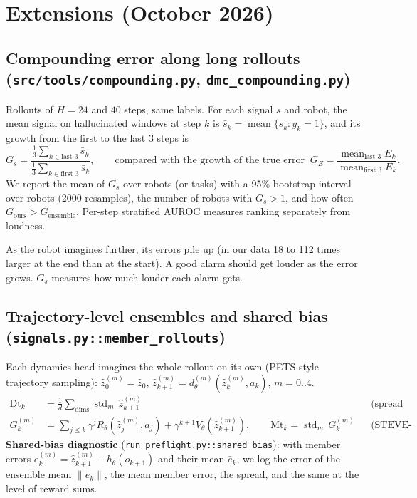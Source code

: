 \documentclass[11pt]{article}
\newcommand{\sd}{\operatorname{std}}
\newcommand{\code}[1]{\texttt{#1}}
\begin{document}
\appendix
\section{Extensions (October 2026)}

\subsection{Compounding error along long rollouts (\code{src/tools/compounding.py}, \code{dmc\_compounding.py})}

Rollouts of $H=24$ and $40$ steps, same labels. For each signal $s$ and robot, the mean signal on hallucinated
windows at step $k$ is $\bar s_k=\operatorname{mean}\{s_k: y_k=1\}$, and its growth from the first to the last 3 steps is
\[
G_s=\frac{\frac13\sum_{k\in\text{last 3}}\bar s_k}{\frac13\sum_{k\in\text{first 3}}\bar s_k},
\qquad\text{compared with the growth of the true error }\ G_E=\frac{\operatorname{mean}_{\text{last 3}}E_k}{\operatorname{mean}_{\text{first 3}}E_k}.
\]
We report the mean of $G_s$ over robots (or tasks) with a 95\% bootstrap interval over robots (2000 resamples), the
number of robots with $G_s>1$, and how often $G_{\text{ours}}>G_{\text{ensemble}}$. Per-step stratified AUROC
measures ranking separately from loudness.

\begin{inwords}
As the robot imagines further, its errors pile up (in our data 18 to 112 times larger at the end than at the
start). A good alarm should get louder as the error grows. $G_s$ measures how much louder each alarm gets.
\end{inwords}

\subsection{Trajectory-level ensembles and shared bias (\code{signals.py::member\_rollouts})}\label{app:traj}

Each dynamics head imagines the whole rollout on its own (PETS-style trajectory sampling):
$\hat z^{(m)}_0=\hat z_0$, $\hat z^{(m)}_{k+1}=d^{(m)}_\theta(\hat z^{(m)}_k,a_k)$, $m=0..4$.
\begin{align*}
\text{Dt}_k&=\tfrac1d\textstyle\sum_{\text{dims}}\sd_m\,\hat z^{(m)}_{k+1} &&\text{(spread of the imagined states)}\\
G^{(m)}_k&=\textstyle\sum_{j\le k}\gamma^j R_\theta(\hat z^{(m)}_j,a_j)+\gamma^{k+1}V_\theta(\hat z^{(m)}_{k+1}),\qquad
\text{Mt}_k=\sd_m\,G^{(m)}_k &&\text{(STEVE-style spread of the heads' own returns)}
\end{align*}
\textbf{Shared-bias diagnostic} (\code{run\_preflight.py::shared\_bias}): with member errors
$e^{(m)}_k=\hat z^{(m)}_{k+1}-h_\theta(o_{k+1})$ and their mean $\bar e_k$, we log the error of the ensemble mean
$\|\bar e_k\|$, the mean member error, the spread, and the same at the level of reward sums.
\end{document}
